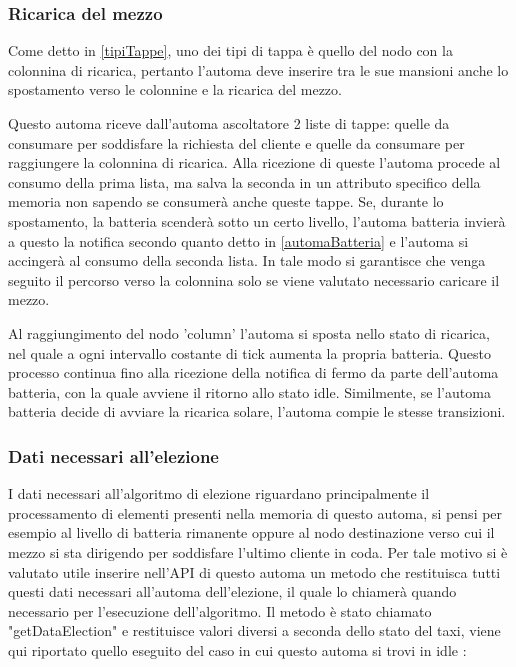 \subsubsection{Ricarica del mezzo} \label{tappe colonnina}
Come detto in \ref{tipiTappe}, uno dei tipi di tappa è quello del nodo con la colonnina di ricarica, pertanto l'automa deve inserire tra le sue mansioni anche lo spostamento verso le colonnine e la ricarica del mezzo.

Questo automa riceve dall'automa ascoltatore 2 liste di tappe: quelle da consumare per soddisfare la richiesta del cliente e quelle da consumare per raggiungere la colonnina di ricarica. Alla ricezione di queste l'automa procede al consumo della prima lista, ma salva la seconda in un attributo specifico della memoria non sapendo se consumerà anche queste tappe. Se, durante lo spostamento, la batteria scenderà sotto un certo livello, l'automa batteria invierà a questo la notifica secondo quanto detto in \ref{automaBatteria} e l'automa si accingerà al consumo della seconda lista. 
In tale modo si garantisce che venga seguito il percorso verso la colonnina solo se viene valutato necessario caricare il mezzo.

Al raggiungimento del nodo 'column' l'automa si sposta nello stato di ricarica, nel quale a ogni intervallo costante di tick aumenta la propria batteria. Questo processo continua fino alla ricezione della notifica di fermo da parte dell'automa batteria, con la quale avviene il ritorno allo stato idle.
Similmente, se l'automa batteria decide di avviare la ricarica solare, l'automa compie le stesse transizioni.

\subsubsection{Dati necessari all'elezione}
I dati necessari all'algoritmo di elezione riguardano principalmente il processamento di elementi presenti nella memoria di questo automa, si pensi per esempio al livello di batteria rimanente oppure al nodo destinazione verso cui il mezzo si sta dirigendo per soddisfare l'ultimo cliente in coda.
Per tale motivo si è valutato utile inserire nell'API di questo automa un metodo che restituisca tutti questi dati necessari all'automa dell'elezione, il quale lo chiamerà quando necessario per l'esecuzione dell'algoritmo. Il metodo è stato chiamato "getDataElection" e restituisce valori diversi a seconda dello stato del taxi, viene qui riportato quello eseguito del caso in cui questo automa si trovi in idle :

